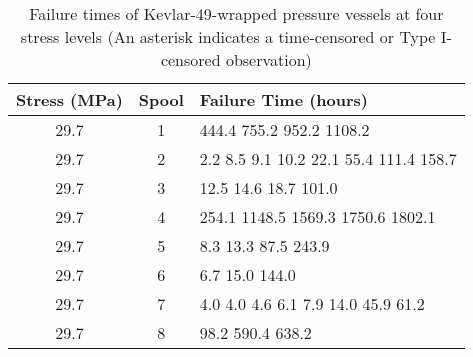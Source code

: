 \documentclass {book}
\begin{document}
\begin{sidebar}
\begin{table}
\caption{Failure times of Kevlar-49-wrapped pressure vessels at
four stress levels (An asterisk indicates a time-censored or Type
I-censored observation) \citep{GK83}}\label{ch10:tab5}
\begin{tabular}{ccl}\\
\hline Stress (MPa) &  Spool&  \hspace{0.2in} Failure Time (hours)\\
\hline%
29.7& 1  & 444.4\hspace{0.02in} 755.2\hspace{0.02in} 952.2\hspace{0.02in} 1108.2\\
29.7& 2  &  2.2\hspace{0.02in} 8.5\hspace{0.02in} 9.1\hspace{0.02in} 10.2\hspace{0.02in} 22.1\hspace{0.02in} 55.4\hspace{0.02in} 111.4\hspace{0.02in} 158.7\\
29.7& 3  &  12.5\hspace{0.02in} 14.6\hspace{0.02in} 18.7\hspace{0.02in} 101.0\\
29.7& 4  &  254.1\hspace{0.02in} 1148.5\hspace{0.02in} 1569.3\hspace{0.02in} 1750.6\hspace{0.02in} 1802.1\\
29.7& 5  &  8.3\hspace{0.02in} 13.3\hspace{0.02in} 87.5\hspace{0.02in} 243.9\\
29.7& 6  &  6.7\hspace{0.02in} 15.0\hspace{0.02in} 144.0\\
29.7& 7  &  4.0\hspace{0.02in} 4.0\hspace{0.02in} 4.6\hspace{0.02in} 6.1\hspace{0.02in} 7.9\hspace{0.02in} 14.0\hspace{0.02in} 45.9\hspace{0.02in} 61.2\\
29.7& 8  &  98.2\hspace{0.02in} 590.4\hspace{0.02in} 638.2\\


\end{tabular}
\end{table}
\end{sidebar}
\end{document}
